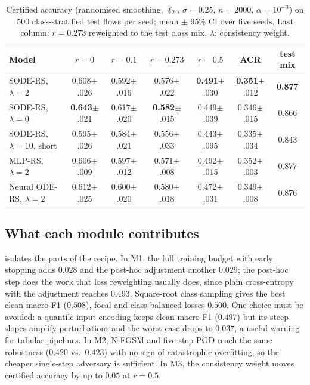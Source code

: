 \documentclass{article}
\theoremstyle{definition}
\newcommand{\ci}[1]{{\scriptsize$\pm$#1}}
\begin{document}
\begin{table}[t]
\caption{Certified accuracy (randomised smoothing, $\ell_2$, $\sigma=0.25$,
$n=2000$, $\alpha=10^{-3}$) on 500 class-stratified test flows per seed; mean
$\pm$ 95\% CI over five seeds. Last column: $r=0.273$ reweighted to the test
class mix. $\lambda$: consistency weight.}
\label{tab:cert}
\centering\footnotesize
\setlength{\tabcolsep}{3.5pt}
\begin{tabular}{lcccccc}
\toprule
Model & $r=0$ & $r=0.1$ & $r=0.273$ & $r=0.5$ & ACR & test mix\\
\midrule
SODE-RS, $\lambda=2$ & 0.608\ci{.026} & 0.592\ci{.016} & 0.576\ci{.022} & \textbf{0.491}\ci{.030} & \textbf{0.351}\ci{.012} & \textbf{0.877}\\
SODE-RS, $\lambda=0$ & \textbf{0.643}\ci{.021} & 0.617\ci{.020} & \textbf{0.582}\ci{.015} & 0.449\ci{.039} & 0.346\ci{.015} & 0.866\\
SODE-RS, $\lambda=10$, short & 0.595\ci{.026} & 0.584\ci{.021} & 0.556\ci{.033} & 0.443\ci{.095} & 0.335\ci{.034} & 0.843\\
\midrule
MLP-RS, $\lambda=2$ & 0.606\ci{.009} & 0.597\ci{.012} & 0.571\ci{.008} & 0.492\ci{.015} & 0.352\ci{.003} & 0.877\\
Neural ODE-RS, $\lambda=2$ & 0.612\ci{.025} & 0.600\ci{.020} & 0.580\ci{.018} & 0.472\ci{.031} & 0.349\ci{.008} & 0.876\\
\bottomrule
\end{tabular}
\end{table}

\subsection{What each module contributes}
 isolates the parts of the recipe. In M1, the full training
budget with early stopping adds $0.028$ and the post-hoc adjustment another
$0.029$; the post-hoc step does the work that loss reweighting usually does,
since plain cross-entropy with the adjustment reaches $0.493$. Square-root class
sampling gives the best clean macro-F1 ($0.508$), focal \citep{lin2017focal} and
class-balanced \citep{cui2019classbalanced} losses $0.500$. One choice must be
avoided: a quantile input encoding keeps clean macro-F1 ($0.497$) but its steep
slopes amplify perturbations and the worst case drops to $0.037$, a useful
warning for tabular pipelines. In M2, N-FGSM and five-step PGD reach the same
robustness ($0.420$ vs.\ $0.423$) with no sign of catastrophic overfitting, so the
cheaper single-step adversary is sufficient. In M3, the consistency weight
moves certified accuracy by up to $0.05$ at $r=0.5$.
\end{document}
